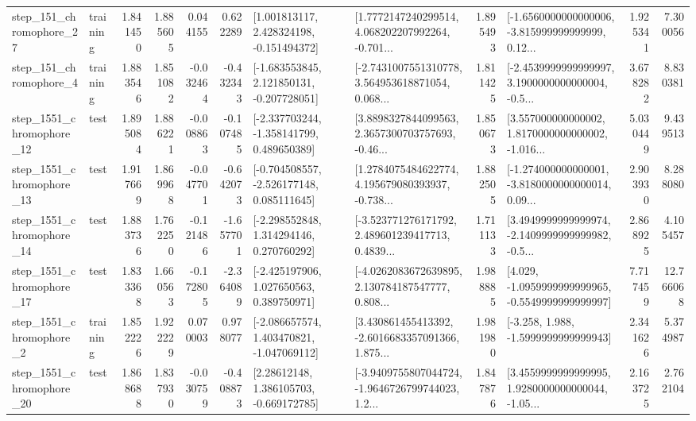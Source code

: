 \begin{tabular}{llrrrrllrlrr}
  step\_151\_chromophore\_27 &  training &      1.841450 &    1.885605 &      0.044155 &  0.622289 &    [1.001813117, 2.428324198, -0.151494372] &  [1.7772147240299514, 4.068202207992264, -0.701... &       1.895493 &  [-1.6560000000000006, -3.815999999999999, 0.12... &            1.925341 &          7.300056 \\
   step\_151\_chromophore\_4 &  training &      1.883546 &    1.851082 &     -0.032464 & -0.432343 &   [-1.683553845, 2.121850131, -0.207728051] &  [-2.7431007551310778, 3.564953618871054, 0.068... &       1.811425 &  [-2.4539999999999997, 3.1900000000000004, -0.5... &            3.678282 &          8.830381 \\
 step\_1551\_chromophore\_12 &      test &      1.895084 &    1.886221 &     -0.008863 & -0.107485 &   [-2.337703244, -1.358141799, 0.489650389] &  [3.8898327844099563, 2.3657300703757693, -0.46... &       1.850673 &  [3.557000000000002, 1.8170000000000002, -1.016... &            5.030449 &          9.439513 \\
 step\_1551\_chromophore\_13 &      test &      1.917669 &    1.869968 &     -0.047701 & -0.642073 &   [-0.704508557, -2.526177148, 0.085111645] &  [1.2784075484622774, 4.195679080393937, -0.738... &       1.882505 &  [-1.274000000000001, -3.8180000000000014, 0.09... &            2.903930 &          8.288080 \\
 step\_1551\_chromophore\_14 &      test &      1.883736 &    1.762250 &     -0.121486 & -1.657701 &    [-2.298552848, 1.314294146, 0.270760292] &  [-3.523771276171792, 2.489601239417713, 0.4839... &       1.711133 &  [3.4949999999999974, -2.1409999999999982, -0.5... &            2.868925 &          4.105457 \\
 step\_1551\_chromophore\_17 &      test &      1.833368 &    1.660563 &     -0.172805 & -2.364089 &    [-2.425197906, 1.027650563, 0.389750971] &  [-4.0262083672639895, 2.130784187547777, 0.808... &       1.988885 &  [4.029, -1.0959999999999965, -0.5549999999999997] &            7.717459 &         12.766068 \\
  step\_1551\_chromophore\_2 &  training &      1.852226 &    1.922229 &      0.070003 &  0.978077 &   [-2.086657574, 1.403470821, -1.047069112] &  [3.430861455413392, -2.6016683357091366, 1.875... &       1.981980 &               [-3.258, 1.988, -1.5999999999999943] &            2.341626 &          5.374987 \\
 step\_1551\_chromophore\_20 &      test &      1.868688 &    1.837930 &     -0.030759 & -0.408873 &     [2.28612148, 1.386105703, -0.669172785] &  [-3.9409755807044724, -1.9646726799744023, 1.2... &       1.847876 &  [3.4559999999999995, 1.9280000000000044, -1.05... &            2.163725 &          2.762104 \\

\end{tabular}
